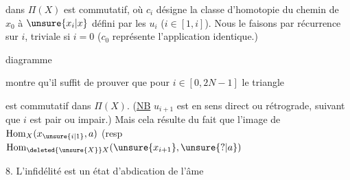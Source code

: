 dans $\Pi(X)$ est commutatif, où $c_i$ désigne la classe d'homotopie du chemin de $x_0$ à $\unsure{x_i|x}$ défini par les $u_i$ ($i\in[1,i]$). Nous le faisons par récurrence sur $i$,   triviale si $i=0$ ($c_0$ représente l'application identique.)

  diagramme


montre qu'il suffit de prouver que pour $i\in[0,2N-1]$ le triangle


est commutatif dans $\Pi(X)$. (\uline{NB} $u_{i+1}$ est en sens direct ou rétrograde, suivant que $i$ est pair ou impair.) Mais cela résulte du fait que  l'image de $\operatorname{Hom}_X(x_{\unsure{i|1}},a)$ (resp $\operatorname{Hom}_{\deleted{\unsure{X}}X}(\unsure{x_{i+1}},\unsure{?|a})$


8. L'infidélité est un état d'abdication de l'âme

